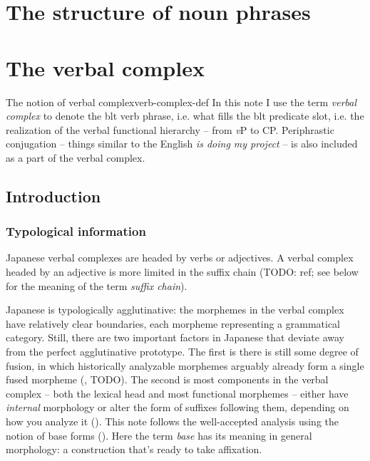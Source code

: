\documentclass[UTF8, a4paper, oneside, scheme=plain]{ctexrep}
\newcommand*{\term}[1]{\emph{#1}}
\newcommand{\corpus}[1]{\emph{#1}}
\newcommand{\vP}{\textit{v}P}
\begin{document}
\chapter{The structure of noun phrases}

\chapter{The verbal complex}\label{chap:verb-complex}

\begin{theorybox}{The notion of verbal complex}{verb-complex-def}
    In this note I use the term \term{verbal complex} to denote the \ac{blt} verb phrase,
    i.e. what fills the \ac{blt} predicate slot,
    i.e. the realization of the verbal functional hierarchy -- from \vP{} to CP.
    Periphrastic conjugation -- things similar to the English \corpus{is doing my project} -- 
    is also included as a part of the verbal complex.
\end{theorybox}

\section{Introduction}

\subsection{Typological information}

Japanese verbal complexes are headed by verbs or adjectives.
A verbal complex headed by an adjective is more limited 
in the suffix chain (TODO: ref; see below for the meaning of the term \term{suffix chain}).

Japanese is typologically agglutinative:
the morphemes in the verbal complex have relatively clear boundaries,
each morpheme representing a grammatical category.
Still, there are two important factors in Japanese that deviate away 
from the perfect agglutinative prototype.
The first is there is still some degree of fusion, 
in which historically analyzable morphemes arguably already form a single fused morpheme 
(, TODO).
The second is most components in the verbal complex 
-- both the lexical head and most functional morphemes --
either have \emph{internal} morphology or alter the form of suffixes following them,
depending on how you analyze it ().
This note follows the well-accepted analysis using the notion of base forms ().
Here the term \term{base} has its meaning in general morphology:
a construction that's ready to take affixation.
\end{document}
